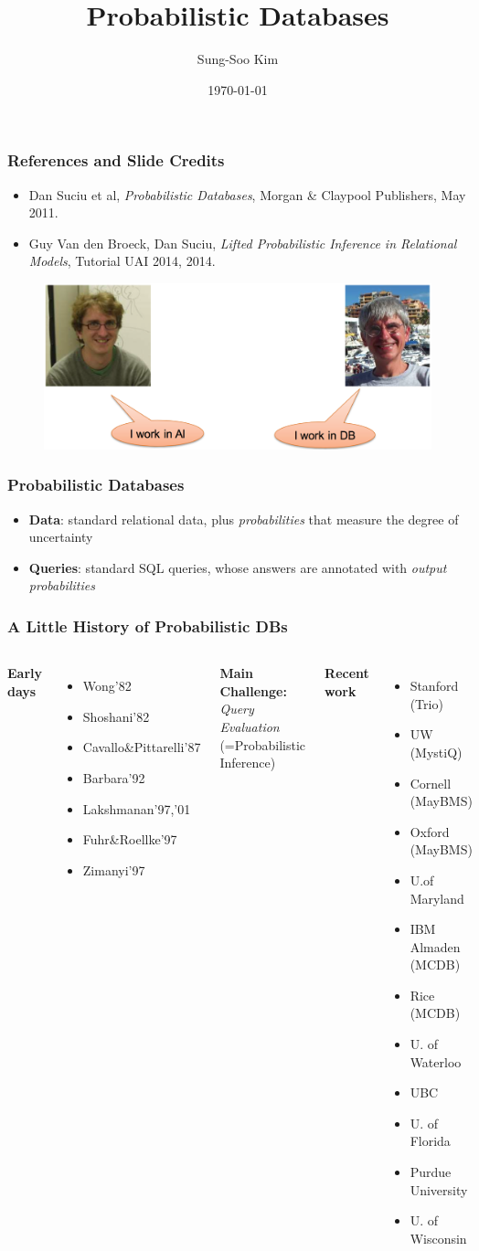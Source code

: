 \documentclass{beamer}
\title[\textit{Flying KIWI}]{Probabilistic Databases} %
\author{Sung-Soo Kim} %
\institute[ETRI] %
{
\textit{sungsoo@etri.re.kr} \\ %
\medskip
Data Management Research Section, ETRI %
}
\date{\today} %
\newcommand{\bi}{\begin{itemize}}
\newcommand{\ei}{\end{itemize}}
\newcommand{\ii}{\item}
\newcommand*{\mygreen}[1]{\textcolor{mygreen}{#1}}
\newcommand*{\myblue}[1]{\textcolor{myblue}{#1}}
\begin{document}
\begin{frame}
\titlepage %
\end{frame}

\begin{frame}
\frametitle{References and Slide Credits}
\bi
\ii Dan Suciu et al, \textit{Probabilistic Databases}, Morgan \& Claypool Publishers, May 2011.
\ii Guy Van den Broeck, Dan Suciu, \textit{Lifted Probabilistic Inference in Relational Models}, Tutorial UAI 2014, 2014.
\ei

\begin{figure}[h]
\centering\includegraphics[width=0.91\linewidth]{authors.png}
\end{figure}

\end{frame}

\begin{frame}
\frametitle{Probabilistic Databases}
\bi
\ii \textbf{Data}: standard relational data, plus \myblue{\textit{probabilities}} that measure the degree of uncertainty
\ei
\bi
\ii \textbf{Queries}: standard SQL queries, whose answers are annotated with \myblue{\textit{output probabilities}}
\ei
\end{frame}


\begin{frame}
\frametitle{A Little History of Probabilistic DBs}
\begin{columns}[c] %

\textbf{Early days}
\bi
\ii Wong'82
\ii Shoshani'82
\ii Cavallo\&Pittarelli'87
\ii Barbara'92
\ii Lakshmanan'97,'01
\ii Fuhr\&Roellke'97
\ii Zimanyi'97
\ei
\textbf{Main Challenge:}\\
\mygreen{\textit{Query Evaluation}}\\
(=Probabilistic Inference)

\textbf{Recent work}
\bi
\ii Stanford (Trio)
\ii UW (MystiQ)
\ii Cornell (MayBMS)
\ii Oxford (MayBMS)
\ii U.of Maryland
\ii IBM Almaden (MCDB)
\ii Rice (MCDB)
\ii U. of Waterloo
\ii UBC
\ii U. of Florida
\ii Purdue University
\ii U. of Wisconsin
\ei

\end{columns}
\end{frame}
\end{document}
